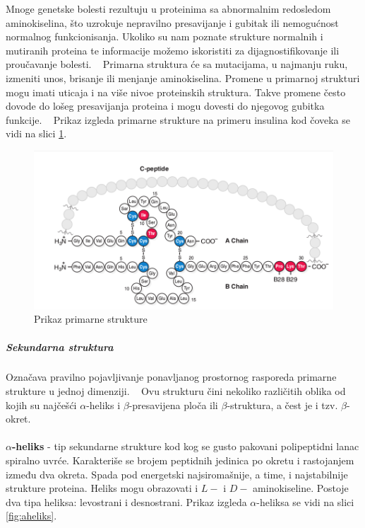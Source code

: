 Mnoge genetske bolesti rezultuju u proteinima sa abnormalnim redosledom aminokiselina, što uzrokuje nepravilno presavijanje i gubitak ili nemogućnost normalnog funkcionisanja. Ukoliko su nam poznate strukture normalnih i mutiranih proteina te informacije možemo iskoristiti za dijagnostifikovanje ili proučavanje bolesti. ~\cite{lippincott} Primarna struktura će sa mutacijama, u najmanju ruku, izmeniti unos, brisanje ili menjanje aminokiselina. Promene u primarnoj strukturi mogu imati uticaja i na više nivoe proteinskih struktura. Takve promene često dovode do lošeg presavijanja proteina i mogu dovesti do njegovog gubitka funkcije. ~\cite{flash}
Prikaz izgleda primarne strukture na primeru insulina kod čoveka se vidi na slici \ref{fig:insulin}.
\begin{figure}[h]
	\centering
    \includegraphics[width=1\textwidth]{Figures/BO/insulin.png}
    \caption{Prikaz primarne strukture~\cite{bmbg}}
    \label{fig:insulin}
\end{figure}
\subparagraph{Sekundarna struktura}
Označava pravilno pojavljivanje ponavljanog prostornog rasporeda primarne strukture u jednoj dimenziji. ~\cite{medbio}
Ovu strukturu čini nekoliko različitih oblika od kojih su najčešći $\alpha$-heliks i $\beta$-presavijena ploča ili $\beta$-struktura, a čest je i tzv. $\beta$-okret.\\\\
\textbf{$\alpha$-heliks} - tip sekundarne strukture kod kog se gusto pakovani polipeptidni lanac spiralno uvrće. Karakteriše se brojem peptidnih jedinica po okretu i rastojanjem između dva okreta. Spada pod energetski najsiromašnije, a time, i najstabilnije strukture proteina. Heliks mogu obrazovati i $L-$ i $D-$ aminokiseline. Postoje dva tipa heliksa: levostrani i desnostrani. Prikaz izgleda $\alpha$-heliksa se vidi na slici \ref{fig:aheliks}.
